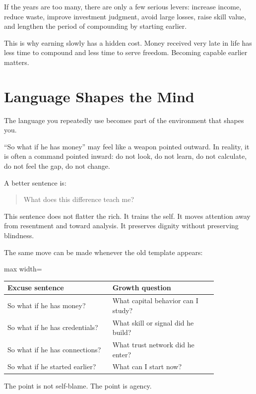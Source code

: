 If the years are too many, there are only a few serious levers: increase income, reduce waste, improve investment judgment, avoid large losses, raise skill value, and lengthen the period of compounding by starting earlier.

This is why earning slowly has a hidden cost. Money received very late in life has less time to compound and less time to serve freedom. Becoming capable earlier matters.

\section*{Language Shapes the Mind}

The language you repeatedly use becomes part of the environment that shapes you.

``So what if he has money'' may feel like a weapon pointed outward. In reality, it is often a command pointed inward: do not look, do not learn, do not calculate, do not feel the gap, do not change.

A better sentence is:

\begin{quote}
What does this difference teach me?
\end{quote}

This sentence does not flatter the rich. It trains the self. It moves attention away from resentment and toward analysis. It preserves dignity without preserving blindness.

The same move can be made whenever the old template appears:

\begin{center}
\begin{adjustbox}{max width=\linewidth}
\begin{tabular}{p{0.42\linewidth}p{0.42\linewidth}}
\hline
Excuse sentence & Growth question \\
\hline
So what if he has money? & What capital behavior can I study? \\
So what if he has credentials? & What skill or signal did he build? \\
So what if he has connections? & What trust network did he enter? \\
So what if he started earlier? & What can I start now? \\
\hline
\end{tabular}
\end{adjustbox}
\end{center}

The point is not self-blame. The point is agency.

